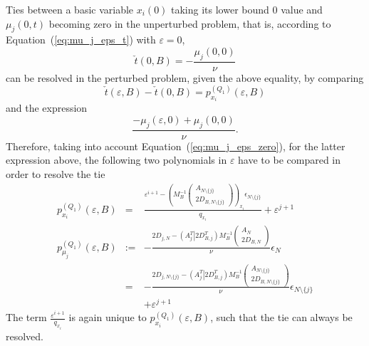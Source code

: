 \documentclass[a4paper]{article}
\newcommand{\pmu}[2]{\ensuremath{p_{\mu_{j}}^{(#1)}(\varepsilon, #2)}}
\newcommand{\px}[3]{\ensuremath{p_{x_{#1}}^{(#2)}(\varepsilon, #3)}}
\begin{document}
Ties between a basic variable $x_{i}(0)$ taking its lower bound $0$ value and
$\mu_{j}\left(0, t\right)$ 
becoming zero in the unperturbed problem, that is,
according to Equation~(\ref{eq:mu_j_eps_t}) with $\varepsilon=0$,
\begin{equation*}
\check{t}\left(0, B\right)  =
-\frac{\mu_{j}\left(0, 0\right)}{\nu}
\end{equation*}
can be resolved in the perturbed problem,
given the above equality, by comparing
\begin{equation*}
\check{t}(\varepsilon, B)-\check{t}(0, B) = \px{i}{Q_{1}}{B}
\end{equation*}
and the expression
\begin{equation*}
\frac{-\mu_{j}(\varepsilon, 0)+ \mu_{j}(0,0)}{\nu}.
\end{equation*}
Therefore, taking into account Equation~(\ref{eq:mu_j_eps_zero}),
for the latter expression above, the following two
polynomials in $\varepsilon$ have to be compared in order to resolve the tie
\begin{eqnarray}
\px{i}{Q_{1}}{B} & = & 
    \frac{\varepsilon^{i+1} -
         \left(M_{B}^{-1}
           \left(\begin{array}{c}
                    A_{N \setminus \{j\}}  \\
	            \hline
	            2D_{B, N \setminus \{j\}}
	         \end{array}
	   \right)
         \right)_{x_{i}}\epsilon_{N \setminus \{j\}}}{q_{x_{i}}}
	 + \varepsilon^{j+1} \\
\label{def:p_mu_j_Q_1}
\pmu{Q_{1}}{B} & := &
  -\frac{2D_{j, N} -
    \left(A_{j}^{T} \left| \right. 2D_{B, j}^{T} \right)
    M_{B}^{-1}
    \left(\begin{array}{c}
            A_{N} \\
	    \hline
	    2D_{B,N}
	  \end{array}
    \right)}{\nu}
  \epsilon_{N}
\nonumber \\
&=&
  -\frac{2D_{j, N \setminus \{j\}} -
    \left(A_{j}^{T} \left| \right. 2D_{B, j}^{T} \right)
    M_{B}^{-1}
    \left(\begin{array}{c}
            A_{N \setminus \{j\}} \\
	    \hline
	    2D_{B,N \setminus \{j\}}
	  \end{array}
    \right)}{\nu}
  \epsilon_{N \setminus \{j\}}
\nonumber \\
&&
+\varepsilon^{j+1}      
\end{eqnarray}
The term $\frac{\varepsilon^{i+1}}{q_{x_{i}}}$ is again unique to 
\px{i}{Q_{1}}{B}, such that the tie can always
be resolved.
\end{document}
